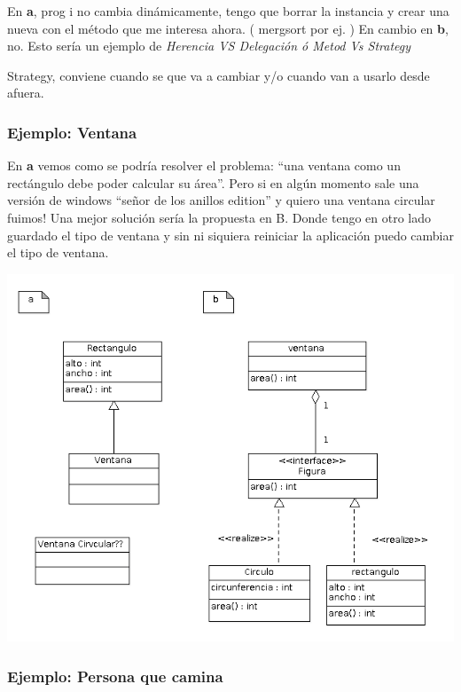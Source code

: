 \documentclass[10pt,a4paper]{article}
\begin{document}
En \textbf{a}, prog i no cambia dinámicamente, tengo que borrar la instancia y crear una nueva con
el método que me interesa ahora. ( mergsort por ej. )
En cambio en \textbf{b}, no. Esto sería un ejemplo de
\textit{Herencia VS Delegación ó Metod Vs Strategy }


Strategy, conviene cuando se que va a cambiar y/o cuando van a usarlo desde afuera.

\subsubsection{ Ejemplo: Ventana }
En \textbf{a} vemos como se podría resolver el problema: 
``una ventana como un rectángulo debe poder calcular su área''. Pero si en algún momento 
sale una versión de windows ``señor de los anillos edition'' y quiero una ventana circular fuimos!
Una mejor solución sería la propuesta en B.
Donde tengo en otro lado guardado el tipo de ventana y sin ni siquiera reiniciar la aplicación puedo cambiar el tipo de ventana.



\includegraphics[scale=0.5]{./img/ventana-figura.png} 



\subsubsection{ Ejemplo:  Persona que camina }
\end{document}
